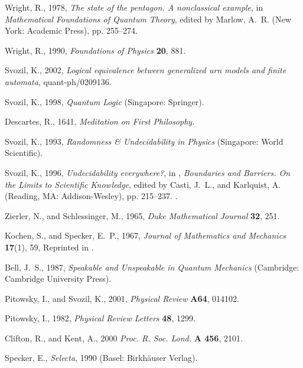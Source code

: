 \documentclass{article}
\begin{document}
\begin{thebibliography}{10}
Wright, R., 1978, {\em The state of the pentagon. {A} nonclassical example},
in  {\em Mathematical Foundations of Quantum   Theory},
edited by Marlow, A.~R. (New York: Academic Press), pp. 255--274.

Wright, R., 1990, {\em Foundations of Physics} {\bf 20}, 881.

Svozil, K., 2002, {\em Logical equivalence between generalized urn models and finite automata},
quant-ph/0209136.

Svozil, K.,  1998, {\em Quantum Logic} (Singapore: Springer).

Descartes, R., 1641, {\em Meditation on First Philosophy}.

Svozil, K., 1993, {\em Randomness \& Undecidability in Physics} (Singapore: World Scientific).

Svozil, K., 1996, {\em Undecidability everywhere?},
in , {\em Boundaries and Barriers.
  On the Limits to Scientific Knowledge}, edited by
Casti, J.~L., and Karlquist, A. (Reading, MA: Addison-Wesley), pp. 215--237.
  .

Zierler, N., and Schlessinger, M., 1965, {\em Duke Mathematical Journal} {\bf 32}, 251.

Kochen, S., and Specker, E.~P., 1967, {\em Journal of Mathematics and Mechanics} {\bf
  17}(1), 59, Reprinted in \cite[pp. 235--263]{specker-ges}.

Bell, J.~S., 1987, {\em Speakable and Unspeakable in Quantum Mechanics} (Cambridge:
Cambridge University Press).

Pitowsky, I., and Svozil, K., 2001, {\em Physical Review} {\bf A64}, 014102.

Pitowsky, I.,  1982, {\em Physical Review Letters} {\bf 48}, 1299.

Clifton, R., and Kent, A., 2000 {\em Proc. R. Soc. Lond.} {\bf A 456}, 2101.

Specker, E., {\em Selecta}, 1990 (Basel: Birkh{\"{a}}user Verlag).

\end{thebibliography}
\end{document}
